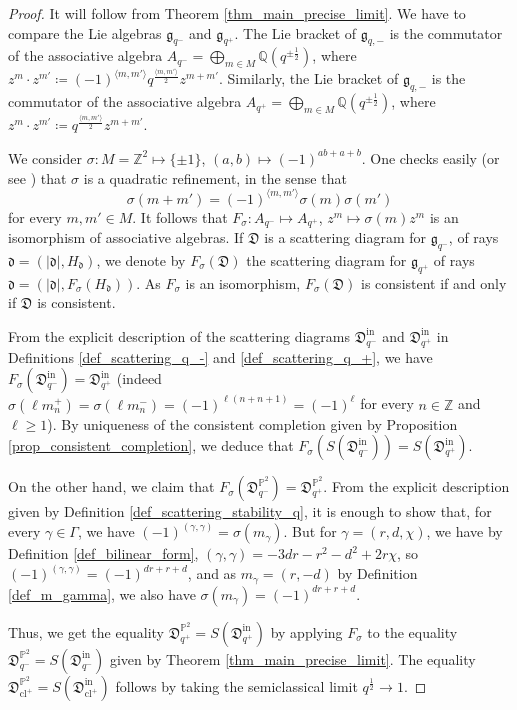 \documentclass[12pt, a4paper]{amsart}
\newcommand\PP{\mathbb P}
\newcommand\Q{\mathbb Q}
\newcommand\Z{\mathbb Z}
\newcommand\fd{\mathfrak d}
\newcommand\fD{\mathfrak D}
\newcommand\fg{\mathfrak g}
\newcommand\cl{\operatorname{cl}}
\newcommand\iin{\mathrm{in}}
\begin{document}
\begin{proof}
It will follow from Theorem \ref{thm_main_precise_limit}. We have to compare the Lie algebras $\fg_{q^-}$ and 
$\fg_{q^+}$. The Lie bracket of $\fg_{q,-}$ is the commutator of the associative algebra 
$A_{q^-}=\bigoplus_{m \in M} \Q(q^{\pm \frac{1}{2}})$, where 
$z^m \cdot z^{m'} \coloneq 
(-1)^{\langle m,m'\rangle}
q^{\frac{\langle m,m'\rangle}{2}}
z^{m+m'}$. Similarly, the 
Lie bracket of $\fg_{q,-}$ is the commutator of the associative algebra 
$A_{q^+}=\bigoplus_{m \in M} \Q(q^{\pm \frac{1}{2}})$, where 
$z^m \cdot z^{m'} \coloneq 
q^{\frac{\langle m,m'\rangle}{2}}
z^{m+m'}$.

We consider $\sigma \colon M=\Z^2 \mapsto \{\pm 1\}$, $(a,b) \mapsto (-1)^{ab+a+b}$.
One checks easily (or see
\cite[Lemma 8.3]{bousseau2018quantum_tropical}) that 
$\sigma$ is a quadratic refinement, in the sense that 
\[\sigma(m+m')=
(-1)^{\langle m,m'\rangle} \sigma(m)\sigma(m')\]
for every $m, m'\in M$.
It follows that $F_\sigma \colon A_{q^-} 
\mapsto A_{q^+}$, 
$z^m \mapsto \sigma(m)z^m$ is an isomorphism of associative algebras.
If $\fD$ is a scattering diagram for 
$\fg_{q^-}$, of rays $\fd=(|\fd|,H_\fd)$, we denote by $F_\sigma(\fD)$ the scattering diagram for $\fg_{q^+}$ of rays 
$\fd=(|\fd|,F_\sigma(H_\fd))$. As $F_\sigma$ is an isomorphism, $F_\sigma(\fD)$ is consistent if and only if $\fD$ is consistent.

From the explicit description of the scattering diagrams 
$\fD^\iin_{q^-}$ and $\fD^\iin_{q^+}$ in Definitions \ref{def_scattering_q_-} and 
\ref{def_scattering_q_+}, we have 
$F_\sigma(\fD^\iin_{q^-})=\fD^\iin_{q^+}$
(indeed $\sigma(\ell m_n^+)
=\sigma(\ell m_n^-)=(-1)^{\ell(n+n+1)}
=(-1)^{\ell}$ for every $n \in \Z$ and 
$\ell \geqslant 1$).
By uniqueness of the consistent completion given by Proposition \ref{prop_consistent_completion}, we deduce that $F_\sigma(S(\fD^\iin_{q^-}))=S(\fD^\iin_{q^+})$. 

On the other hand, we claim that 
$F_\sigma(\fD^{\PP^2}_{q^-})
=\fD^{\PP^2}_{q^+}$. From the explicit description given by Definition
\ref{def_scattering_stability_q},
it is enough to show that, for every 
$\gamma \in \Gamma$, we have 
$(-1)^{(\gamma,\gamma)}=\sigma(m_\gamma)$.
But for $\gamma=(r,d,\chi)$, we have by Definition \ref{def_bilinear_form},
$(\gamma,\gamma)=-3dr-r^2-d^2+2r\chi$, so
$(-1)^{(\gamma,\gamma)}
=(-1)^{dr+r+d}$, and as $m_\gamma=(r,-d)$
by Definition \ref{def_m_gamma}, we also have $\sigma(m_\gamma)=(-1)^{dr+r+d}$.

Thus, we get the equality $\fD_{q^+}^{\PP^2}=S(\fD^\iin_{q^+})$ by applying $F_\sigma$ to the equality 
$\fD_{q^-}^{\PP^2}=S(\fD^\iin_{q^-})$
given by Theorem \ref{thm_main_precise_limit}. The equality 
$\fD_{\cl^+}^{\PP^2}=S(\fD^\iin_{\cl^+})$ 
follows by taking the semiclassical limit
$q^{\frac{1}{2}} \rightarrow 1$.
\end{proof}
\end{document}
